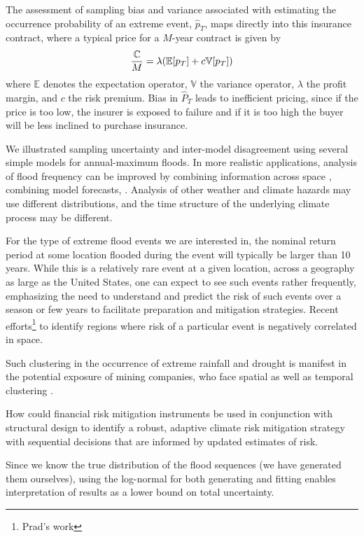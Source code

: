 \documentclass[12pt]{article}
\begin{document}
The assessment of sampling bias and variance associated with estimating the occurrence probability of an extreme event, $\hat{p}_T$, maps directly into this insurance contract, where a typical price for a $M$-year contract is given by
\begin{equation}\label{eq:insurance-price}
  \frac{\mathbb{C}}{M} = \lambda \qty(\mathbb{E} \qty[p_T] + c \mathbb{V} \qty[p_T])
\end{equation}
where $\mathbb{E}$ denotes the expectation operator, $\mathbb{V}$ the variance operator, $\lambda$ the profit margin, and $c$ the risk premium.
Bias in $\hat{P}_T$ leads to inefficient pricing, since if the price is too low, the insurer is exposed to failure and if it is too high the buyer will be less inclined to purchase insurance.

We illustrated sampling uncertainty and inter-model disagreement using several simple models for annual-maximum floods.
In more realistic applications, analysis of flood frequency can be improved by combining information across space \citep{Lima2016,Merz2008a}, combining model forecasts, \etc{}.
Analysis of other weather and climate hazards may use different distributions, and the time structure of the underlying climate process may be different.

For the type of extreme flood events we are interested in, the nominal return period at some location flooded during the event will typically be larger than 10 years.
While this is a relatively rare event at a given location, across a geography as large as the United States, one can expect to see such events rather frequently, emphasizing the need to understand and predict the risk of such events over a season or few years to facilitate preparation and mitigation strategies.
Recent efforts\footnote{Prad's work} to identify regions where risk of a particular event is negatively correlated in space.

Such clustering in the occurrence of extreme rainfall and drought is manifest in the potential exposure of mining companies, who face spatial as well as temporal clustering \citep{Bonnafous2017a,Bonnafous2017b}.

How could  financial risk mitigation instruments be used in conjunction with structural design to identify a robust, adaptive climate risk mitigation strategy with sequential decisions that are informed by updated estimates of risk.

Since we know the true distribution of the flood sequences (we have generated them ourselves), using the log-normal for both generating and fitting enables interpretation of results as a lower bound on total uncertainty.
\end{document}
